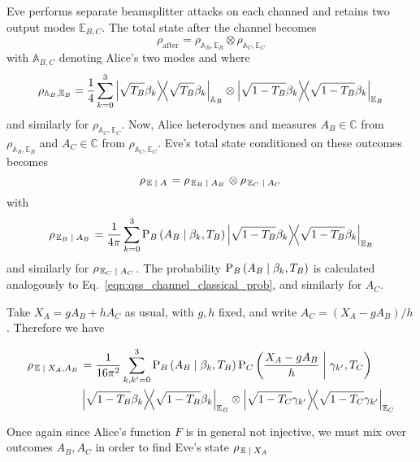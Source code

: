 \noindent Eve performs separate beamsplitter attacks on each channed and retains two output modes $\mathbb{E}_{B, C}$. The total state after the channel becomes
\begin{equation}
\rho_{\text{after}} = \rho_{\mathbb{A}_B, \mathbb{E}_B} \otimes \rho_{\mathbb{A}_C, \mathbb{E}_C}
\end{equation}
with $\mathbb{A}_{B, C}$ denoting Alice's two modes and where
\begin{equation}
\rho_{\mathbb{A}_B, \mathbb{E}_B} = \frac{1}{4} \sum_{k=0}^3 \dyad{\sqrt{T_B} \beta_k}_{\mathbb{A}_B} \otimes \dyad{\sqrt{1-T_B} \beta_k}_{\mathbb{E}_B}
\end{equation}
and similarly for $\rho_{\mathbb{A}_C, \mathbb{E}_C}$. Now, Alice heterodynes and measures $A_B \in \mathbb{C}$ from $\rho_{\mathbb{A}_B, \mathbb{E}_B}$ and $A_C \in \mathbb{C}$ from $\rho_{\mathbb{A}_C, \mathbb{E}_C}$. Eve's total state conditioned on these outcomes becomes 
\begin{equation}
\rho_{\left.\mathbb{E} \; \middle| \; A\right.} = \rho_{\left.\mathbb{E}_B \; \middle| \; A_B\right.} \otimes \rho_{\left. \mathbb{E}_C \; \middle| \; A_C\right.}
\end{equation}
with
\begin{equation}
\rho_{\left.\mathbb{E}_B \given A_B\right.} = \frac{1}{4 \pi} \sum_{k=0}^3 \text{P}_B\left(A_B \given \beta_k, T_B\right) \dyad{\sqrt{1-T_B} \beta_k}_{\mathbb{E}_B}
\end{equation}
and similarly for $\rho_{\left.\mathbb{E}_C \; \middle| \; A_C\right.}$. The probability $\text{P}_B\left(A_B \; \middle| \; \beta_k, T_B\right)$ is calculated analogously to Eq.~\ref{eqn:qss_channel_classical_prob}, and similarly for $A_C$.

Take $X_A = g A_B + h A_C$ as usual, with $g, h$ fixed, and write $A_C = \left(X_A - g A_B\right)/h$. Therefore we have

\begin{align}\label{eqn:qss_deriv_8}
\rho_{\left. \mathbb{E} \given X_A, A_B\right.} &= \frac{1}{16 \pi^2} \sum_{k, k^\prime = 0}^3 \text{P}_B\left(A_B \given \beta_k, T_B\right) \text{P}_C\left(\frac{X_A - g A_B}{h} \given \gamma_{k^\prime}, T_C\right) \notag \\
%
&\dyad{\sqrt{1-T_B} \beta_k}_{\mathbb{E}_B} \otimes \dyad{\sqrt{1-T_C}\gamma_{k^\prime}}_{\mathbb{E}_C}
\end{align}

\noindent Once again since Alice's function $F$ is in general not injective, we must mix over outcomes $A_B, A_C$ in order to find Eve's state $\rho_{\left.\mathbb{E} \; \middle| \; X_A\right.}$

